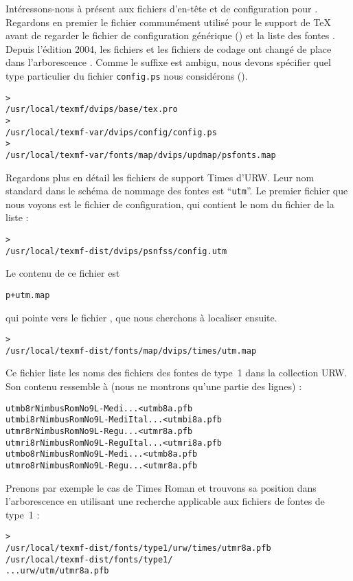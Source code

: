 \documentclass[german, english, french]{article}
\renewcommand{\samp}[1]{\enquote{\texttt{#1}}}
\begin{document}
Intéressons-nous à présent aux fichiers d'en-tête et de configuration pour
.  Regardons en premier le fichier  communément
utilisé pour le support de \TeX{} avant de regarder le fichier de configuration
générique () et la liste des fontes \PS{} .
Depuis l'édition 2004, les fichiers  et les fichiers de codage ont
changé de place dans l'arborescence . Comme le suffixe 
est ambigu, nous devons spécifier quel type particulier du fichier
\texttt{config.ps} nous considérons ().
\begin{alltt}
> 
   /usr/local/texmf/dvips/base/tex.pro
> 
   /usr/local/texmf-var/dvips/config/config.ps
> 
   /usr/local/texmf-var/fonts/map/dvips/updmap/psfonts.map
\end{alltt}

Regardons plus en détail les fichiers de support Times \PS{} d'URW. Leur nom
standard dans le schéma de nommage des fontes est \samp{utm}. Le premier fichier
que nous voyons est le fichier de configuration, qui contient le nom du fichier
de la liste :
\begin{alltt}
> 
   /usr/local/texmf-dist/dvips/psnfss/config.utm
\end{alltt}
Le contenu de ce fichier est
\begin{alltt}
  p +utm.map
\end{alltt}
qui pointe vers le fichier , que nous cherchons à localiser
ensuite.
\begin{alltt}
> 
  /usr/local/texmf-dist/fonts/map/dvips/times/utm.map
\end{alltt}
Ce fichier liste les noms des fichiers des fontes \PS{} de type~1 dans la
collection URW. Son contenu ressemble à (nous ne montrons qu'une partie des
lignes) :
\begin{alltt}
utmb8r  NimbusRomNo9L-Medi    ... <utmb8a.pfb
utmbi8r NimbusRomNo9L-MediItal... <utmbi8a.pfb
utmr8r  NimbusRomNo9L-Regu    ... <utmr8a.pfb
utmri8r NimbusRomNo9L-ReguItal... <utmri8a.pfb
utmbo8r NimbusRomNo9L-Medi    ... <utmb8a.pfb
utmro8r NimbusRomNo9L-Regu    ... <utmr8a.pfb
\end{alltt}
Prenons par exemple le cas de Times Roman  et trouvons sa
position dans l'arborescence  en utilisant une recherche applicable
aux fichiers de fontes de type~1 :
\begin{alltt}
> 
\ifSingleColumn   /usr/local/texmf-dist/fonts/type1/urw/times/utmr8a.pfb
\else   /usr/local/texmf-dist/fonts/type1/
... urw/utm/utmr8a.pfb
\fi\end{alltt}
\end{document}
